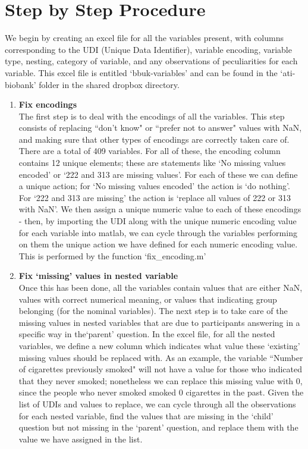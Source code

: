 \documentclass{article}
\begin{document}
\section*{Step by Step Procedure}
We begin by creating an excel file for all the variables present, with columns corresponding to the UDI (Unique Data Identifier), variable encoding, variable type, nesting, category of variable, and any observations of peculiarities for each variable. This excel file is entitled `bbuk-variables' and can be found in the `ati-biobank' folder in the shared dropbox directory. 
\begin{enumerate}
\subsubsection*{Encodings and Nested Variables}
\item {\bf Fix encodings} \\
The first step is to deal with the encodings of all the variables. This step consists of replacing ``don't know" or ``prefer not to answer" values with NaN, and making sure that other types of encodings are correctly taken care of. There are a total of 409 variables. For all of these, the encoding column contains 12 unique elements; these are statements like `No missing values encoded' or `222 and 313 are missing values'. For each of these we can define a unique action; for `No missing values encoded' the action is `do nothing'. For `222 and 313 are missing' the action is `replace all values of 222 or 313 with NaN'. We then assign a unique numeric value to each of these encodings - then, by importing the UDI along with the unique numeric encoding value for each variable into matlab, we can cycle through the variables performing on them the unique action we have defined for each numeric encoding value. This is performed by the function `fix\_encoding.m' \\
\item {\bf Fix `missing' values in nested variable} \\
Once this has been done, all the variables contain values that are either NaN, values with correct numerical meaning, or values that indicating group belonging (for the nominal variables). The next step is to take care of the missing values in nested variables that are due to participants answering in a specific way in the`parent' question. In the excel file, for all the nested variables, we define a new column which indicates what value these `existing' missing values should be replaced with. As an example, the variable ``Number of cigarettes previously smoked" will not have a value for those who indicated that they never smoked; nonetheless we can replace this missing value with 0, since the people who never smoked smoked 0 cigarettes in the past. Given the list of UDIs and values to replace, we can cycle through all the observations for each nested variable, find the values that are missing in the `child' question but not missing in the `parent' question, and replace them with the value we have assigned in the list. 
     \\
\vspace{-0.5cm}

\end{enumerate}
\end{document}
